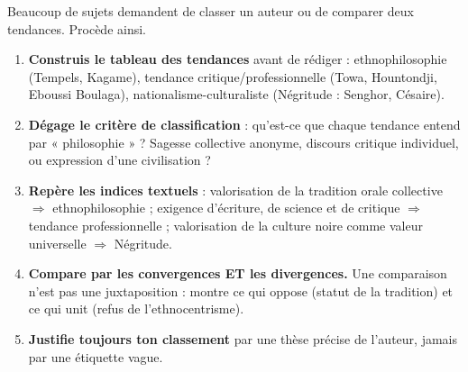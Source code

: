 \documentclass[11pt]{article}
\begin{document}
\begin{methode}
Beaucoup de sujets demandent de classer un auteur ou de comparer deux tendances. Procède ainsi.

\begin{enumerate}
\item \textbf{Construis le tableau des tendances} avant de rédiger : ethnophilosophie (Tempels, Kagame), tendance critique/professionnelle (Towa, Hountondji, Eboussi Boulaga), nationalisme-culturaliste (Négritude : Senghor, Césaire).
\item \textbf{Dégage le critère de classification} : qu'est-ce que chaque tendance entend par « philosophie » ? Sagesse collective anonyme, discours critique individuel, ou expression d'une civilisation ?
\item \textbf{Repère les indices textuels} : valorisation de la tradition orale collective $\Rightarrow$ ethnophilosophie ; exigence d'écriture, de science et de critique $\Rightarrow$ tendance professionnelle ; valorisation de la culture noire comme valeur universelle $\Rightarrow$ Négritude.
\item \textbf{Compare par les convergences ET les divergences.} Une comparaison n'est pas une juxtaposition : montre ce qui oppose (statut de la tradition) et ce qui unit (refus de l'ethnocentrisme).
\item \textbf{Justifie toujours ton classement} par une thèse précise de l'auteur, jamais par une étiquette vague.
\end{enumerate}
\end{methode}
\end{document}
